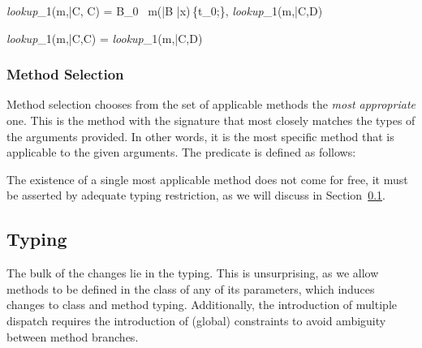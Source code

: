 \documentclass[11pt]{article}
\begin{document}


  {\textit{lookup}_1(m,\bar{C}, C) = B_0 \ m(\bar{B} \bar{x})\,\{t_0;\}, \textit{lookup}_1(m,\bar{C},D)}

  {\textit{lookup}_1(m,\bar{C},C) = \textit{lookup}_1(m,\bar{C},D)}



\subsubsection*{Method Selection}

Method selection chooses from the set of applicable methods the \emph{most appropriate} one. This is the method with the signature that most closely matches the types of the arguments provided. In other words, it is the most specific method that is applicable to the given arguments. The predicate is defined as follows:


The existence of a single most applicable method does not come for free, it must be asserted by adequate typing restriction, as we will discuss in Section~\ref{sec:typing}.


\subsection{Typing}
\label{sec:typing}

The bulk of the changes lie in the typing. This is unsurprising, as we allow methods to be defined in the class of any of its parameters, which induces changes to class and method typing. Additionally, the introduction of multiple dispatch requires the introduction of (global) constraints to avoid ambiguity between method branches. 
\end{document}
